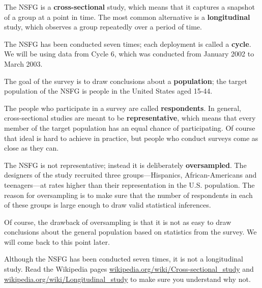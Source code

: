 \documentclass[12pt]{book}
\begin{document}
The NSFG is a {\bf cross-sectional} study, which means that it
captures a snapshot of a group at a point in time.  The most
common alternative is a {\bf longitudinal} study, which observes a
group repeatedly over a period of time.

The NSFG has been conducted seven times; each deployment is called
a {\bf cycle}.  We will be using data from Cycle 6, which was
conducted from January 2002 to March 2003.

The goal of the survey is to draw conclusions about a
{\bf population}; the target population of the NSFG is people in
the United States aged 15-44.

The people who participate in a survey are called {\bf respondents}.
In general, cross-sectional studies are meant to be {\bf
  representative}, which means that every member of the target
population has an equal chance of participating.  Of course that ideal
is hard to achieve in practice, but people who conduct surveys come as
close as they can.

The NSFG is not representative; instead it is deliberately {\bf
  oversampled}.  The designers of the study recruited three
groups---Hispanics, African-Americans and teenagers---at rates higher
than their representation in the U.S. population.
The reason for oversampling is to make sure that the number of
respondents in each of these groups is large enough to draw valid
statistical inferences.

Of course, the drawback of oversampling is that it is not as easy
to draw conclusions about the general population based on statistics
from the survey.  We will come back to this point later.

\begin{ex}

Although the NSFG has been conducted seven times, it is not a
longitudinal study.  Read the Wikipedia pages
\url{wikipedia.org/wiki/Cross-sectional_study}
and
\url{wikipedia.org/wiki/Longitudinal_study}
to make sure you understand why not.

\end{ex}
\end{document}
